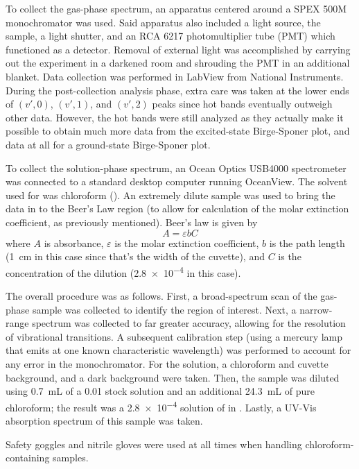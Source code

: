 \documentclass[../labs.tex]{subfiles}
\begin{document}
To collect the gas-phase spectrum, an apparatus centered around a SPEX 500M monochromator was used. Said apparatus also included a light source, the  sample, a light shutter, and an RCA 6217 photomultiplier tube (PMT) which functioned as a detector. Removal of external light was accomplished by carrying out the experiment in a darkened room and shrouding the PMT in an additional blanket. Data collection was performed in LabView from National Instruments\supercite{bib:LabManual}. During the post-collection analysis phase, extra care was taken at the lower ends of $(v',0)$, $(v',1)$, and $(v',2)$ peaks since hot bands eventually outweigh other data. However, the hot bands were still analyzed as they actually make it possible to obtain much more data from the excited-state Birge-Sponer plot, and data at all for a ground-state Birge-Sponer plot\supercite{bib:McNaughtI2}.\par
To collect the solution-phase spectrum, an Ocean Optics USB4000 spectrometer was connected to a standard desktop computer running OceanView. The solvent used for  was chloroform (). An extremely dilute sample was used to bring the data in to the Beer's Law region (to allow for calculation of the molar extinction coefficient, as previously mentioned). Beer's law is given by
\begin{equation*}
    A = \varepsilon bC
\end{equation*}
where $A$ is absorbance, $\varepsilon$ is the molar extinction coefficient, $b$ is the path length (\SI{1}{\centi\meter} in this case since that's the width of the cuvette), and $C$ is the concentration of the dilution (\SI{2.8e-4}{\molar} in this case).\par
The overall procedure was as follows. First, a broad-spectrum scan of the gas-phase sample was collected to identify the region of interest. Next, a narrow-range spectrum was collected to far greater accuracy, allowing for the resolution of vibrational transitions. A subsequent calibration step (using a mercury lamp that emits at one known characteristic wavelength) was performed to account for any error in the monochromator. For the solution, a chloroform and cuvette background, and a dark background were taken. Then, the sample was diluted using \SI{0.7}{\milli\liter} of a \SI{0.01}{\molar} stock solution and an additional \SI{24.3}{\milli\liter} of pure chloroform; the result was a \SI{2.8e-4}{\molar} solution of  in . Lastly, a UV-Vis absorption spectrum of this sample was taken.\par
Safety goggles and nitrile gloves were used at all times when handling chloroform-containing samples.
\end{document}

